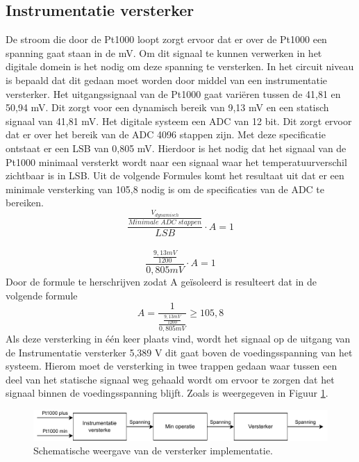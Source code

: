 \subsection{Instrumentatie versterker}
De stroom die door de Pt1000 loopt zorgt ervoor dat er over de Pt1000 een spanning gaat staan in de mV. Om dit signaal te kunnen verwerken in het digitale domein is het nodig om deze spanning te versterken. In het circuit niveau is bepaald dat dit gedaan moet worden door middel van een instrumentatie versterker. Het uitgangssignaal van de Pt1000 gaat variëren tussen de 41,81 en 50,94 mV. Dit zorgt voor een dynamisch bereik van 9,13 mV en een statisch signaal van 41,81 mV. Het digitale systeem een ADC van 12 bit. Dit zorgt ervoor dat er over het bereik van de ADC 4096 stappen zijn. Met deze specificatie ontstaat er een LSB van 0,805 mV. Hierdoor is het nodig dat het signaal van de Pt1000 minimaal versterkt wordt naar een signaal waar het temperatuurverschil zichtbaar is in LSB. Uit de volgende Formules komt het resultaat uit dat er een minimale versterking van 105,8 nodig is om de specificaties van de ADC te bereiken.
\[
\frac{\frac{V_{dynamisch}}{Minimale\; ADC\; stappen}}{LSB} \cdot A = 1
\]
\\
\[
\frac{\frac{9,13 mV}{1200}}{0,805 mV} \cdot A = 1
\]
Door de formule te herschrijven zodat A geïsoleerd is resulteert dat in de volgende formule
\[
A = \frac{1}{\frac{\frac{9,13 mV}{1200}}{0,805 mV}} \geq 105,8
\]
Als deze versterking in één keer plaats vind, wordt het signaal op de uitgang van de Instrumentatie versterker 5,389 V dit gaat boven de voedingsspanning van het systeem. Hierom moet de versterking in twee trappen gedaan waar tussen een deel van het statische signaal weg gehaald wordt om ervoor te zorgen dat het signaal binnen de voedingsspanning blijft. Zoals is weergegeven in Figuur \ref{fig:schema_versterkers_component_1}.

\begin{figure}[H]
    \centering
    \includegraphics[width=0.8\linewidth]{pictures/schema_instrumentatie_versterker.drawio.pdf}
    \caption{Schematische weergave van de versterker implementatie.}
    \label{fig:schema_versterkers_component_1}
\end{figure}


